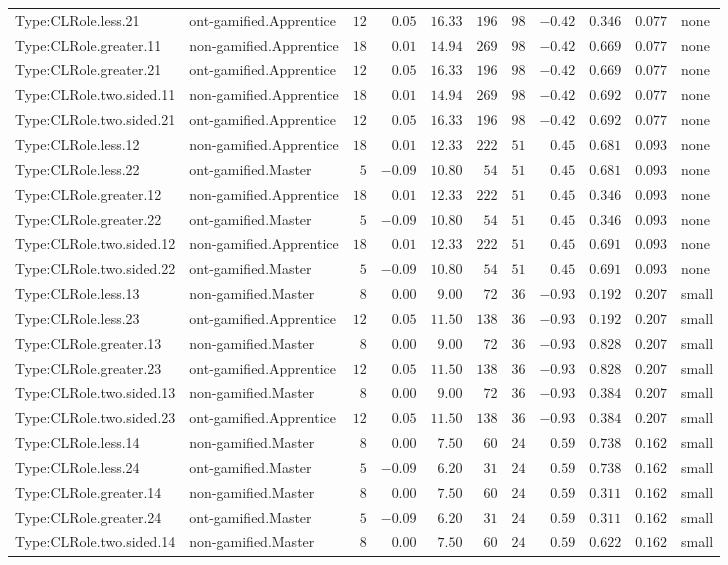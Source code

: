 \documentclass[6pt,a4paper]{article}
\begin{document}
{\begin{longtable}{llrrrrrrrrl}
Type:CLRole.less.21&ont-gamified.Apprentice&$12$&$ 0.05$&$16.33$&$196$&$ 98$&$-0.42$&$0.346$&$0.077$&none\tabularnewline
Type:CLRole.greater.11&non-gamified.Apprentice&$18$&$ 0.01$&$14.94$&$269$&$ 98$&$-0.42$&$0.669$&$0.077$&none\tabularnewline
Type:CLRole.greater.21&ont-gamified.Apprentice&$12$&$ 0.05$&$16.33$&$196$&$ 98$&$-0.42$&$0.669$&$0.077$&none\tabularnewline
Type:CLRole.two.sided.11&non-gamified.Apprentice&$18$&$ 0.01$&$14.94$&$269$&$ 98$&$-0.42$&$0.692$&$0.077$&none\tabularnewline
Type:CLRole.two.sided.21&ont-gamified.Apprentice&$12$&$ 0.05$&$16.33$&$196$&$ 98$&$-0.42$&$0.692$&$0.077$&none\tabularnewline
Type:CLRole.less.12&non-gamified.Apprentice&$18$&$ 0.01$&$12.33$&$222$&$ 51$&$ 0.45$&$0.681$&$0.093$&none\tabularnewline
Type:CLRole.less.22&ont-gamified.Master&$ 5$&$-0.09$&$10.80$&$ 54$&$ 51$&$ 0.45$&$0.681$&$0.093$&none\tabularnewline
Type:CLRole.greater.12&non-gamified.Apprentice&$18$&$ 0.01$&$12.33$&$222$&$ 51$&$ 0.45$&$0.346$&$0.093$&none\tabularnewline
Type:CLRole.greater.22&ont-gamified.Master&$ 5$&$-0.09$&$10.80$&$ 54$&$ 51$&$ 0.45$&$0.346$&$0.093$&none\tabularnewline
Type:CLRole.two.sided.12&non-gamified.Apprentice&$18$&$ 0.01$&$12.33$&$222$&$ 51$&$ 0.45$&$0.691$&$0.093$&none\tabularnewline
Type:CLRole.two.sided.22&ont-gamified.Master&$ 5$&$-0.09$&$10.80$&$ 54$&$ 51$&$ 0.45$&$0.691$&$0.093$&none\tabularnewline
Type:CLRole.less.13&non-gamified.Master&$ 8$&$ 0.00$&$ 9.00$&$ 72$&$ 36$&$-0.93$&$0.192$&$0.207$&small\tabularnewline
Type:CLRole.less.23&ont-gamified.Apprentice&$12$&$ 0.05$&$11.50$&$138$&$ 36$&$-0.93$&$0.192$&$0.207$&small\tabularnewline
Type:CLRole.greater.13&non-gamified.Master&$ 8$&$ 0.00$&$ 9.00$&$ 72$&$ 36$&$-0.93$&$0.828$&$0.207$&small\tabularnewline
Type:CLRole.greater.23&ont-gamified.Apprentice&$12$&$ 0.05$&$11.50$&$138$&$ 36$&$-0.93$&$0.828$&$0.207$&small\tabularnewline
Type:CLRole.two.sided.13&non-gamified.Master&$ 8$&$ 0.00$&$ 9.00$&$ 72$&$ 36$&$-0.93$&$0.384$&$0.207$&small\tabularnewline
Type:CLRole.two.sided.23&ont-gamified.Apprentice&$12$&$ 0.05$&$11.50$&$138$&$ 36$&$-0.93$&$0.384$&$0.207$&small\tabularnewline
Type:CLRole.less.14&non-gamified.Master&$ 8$&$ 0.00$&$ 7.50$&$ 60$&$ 24$&$ 0.59$&$0.738$&$0.162$&small\tabularnewline
Type:CLRole.less.24&ont-gamified.Master&$ 5$&$-0.09$&$ 6.20$&$ 31$&$ 24$&$ 0.59$&$0.738$&$0.162$&small\tabularnewline
Type:CLRole.greater.14&non-gamified.Master&$ 8$&$ 0.00$&$ 7.50$&$ 60$&$ 24$&$ 0.59$&$0.311$&$0.162$&small\tabularnewline
Type:CLRole.greater.24&ont-gamified.Master&$ 5$&$-0.09$&$ 6.20$&$ 31$&$ 24$&$ 0.59$&$0.311$&$0.162$&small\tabularnewline
Type:CLRole.two.sided.14&non-gamified.Master&$ 8$&$ 0.00$&$ 7.50$&$ 60$&$ 24$&$ 0.59$&$0.622$&$0.162$&small\tabularnewline

\end{longtable}}
\end{document}
